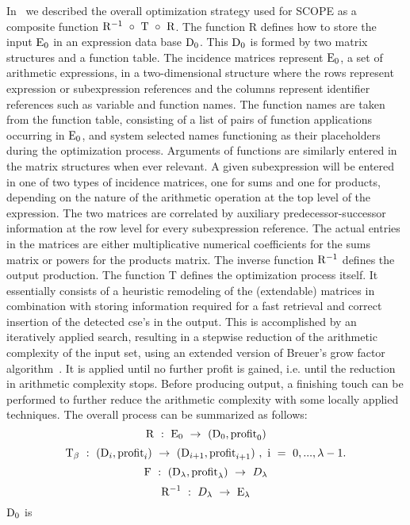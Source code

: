 In~\cite{vanHulzen:81,vanHulzen:83} we described the overall
optimization strategy used for
SCOPE as a composite function ${{\rm R}^{-1}}\ \circ\ {{\rm T}}\
\circ\ {{\rm R}}$.  The function R defines how to store the input
${{\rm E}}_{0}$ in an expression data base ${{\rm D}}_{0}$. This
${{\rm D}}_{0}$ is formed by two matrix structures and a function
table.  The incidence matrices represent ${{\rm E}}_{0}$, a set of
arithmetic expressions, in a two-dimensional structure where the rows
represent expression or subexpression references and the columns
represent identifier references such as variable and function names.
The function names are taken from the function table, consisting of a
list of pairs of function applications occurring in ${{\rm E}}_0$, and
system selected names functioning as their placeholders during the
optimization process. Arguments of functions are similarly entered in
the matrix structures when ever relevant.  A given subexpression will
be entered in one of two types of incidence matrices, one for sums and
one for products, depending on the nature of the arithmetic operation
at the top level of the expression.  The two matrices are correlated
by auxiliary predecessor-successor information at the row level for
every subexpression reference. The actual entries in the matrices are
either multiplicative numerical coefficients for the sums matrix or
powers for the products matrix.  The inverse function ${{\rm
R}}^{{-1}}$ defines the output production.  The function T defines the
optimization process itself. It essentially consists of a heuristic
remodeling of the (extendable) matrices in combination with storing
information required for a fast retrieval and correct insertion of the
detected cse's in the output.  This is accomplished by an iteratively
applied search, resulting in a stepwise reduction of the arithmetic
complexity of the input set, using an extended version of Breuer's
\index{Breuer's Algorithm}
grow factor algorithm~\cite{Breuer:69,vanHulzen:81,vanHulzen:83}.
It is applied until no further profit
is gained, i.e. until the reduction in arithmetic complexity stops.
Before producing output, a finishing touch can be performed to further
reduce the arithmetic complexity with some locally applied techniques.
The overall process can be summarized as follows: $$ {{\rm R}}\ :\
{{{\rm E}}_0}\ \to\ ({{{\rm D}}_0},{{{\rm profit}}_0}) $$ $$ {{{\rm
T}}_{\beta}}\ :\ ({{{\rm D}}_i},{{{\rm profit}}_i})\ \to\ ({{{\rm
D}}_{{i+1}}},{{{\rm profit}}_{{i+1}}})\ ,\ {{\rm i}}\ =\ 0,..., \lambda
- 1.  $$ $$ {{\rm F}}\ :\ ({{{\rm D}}_{\lambda}},{{{\rm
profit}}_{\lambda}})\ \to\ {D_{\lambda}} $$ $$ {{{\rm R}}^{{-1}}}\ :\
{D_{\lambda}}\ \to\ {{{\rm E}}_{\lambda}} $$ ${{\rm D}}_{0}$ is

